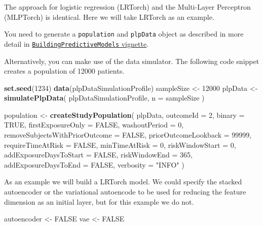 \documentclass[]{article}
\newenvironment{Shaded}{\begin{snugshade}}{\end{snugshade}}
\newcommand{\KeywordTok}[1]{\textcolor[rgb]{0.13,0.29,0.53}{\textbf{#1}}}
\newcommand{\DataTypeTok}[1]{\textcolor[rgb]{0.13,0.29,0.53}{#1}}
\newcommand{\DecValTok}[1]{\textcolor[rgb]{0.00,0.00,0.81}{#1}}
\newcommand{\StringTok}[1]{\textcolor[rgb]{0.31,0.60,0.02}{#1}}
\newcommand{\OtherTok}[1]{\textcolor[rgb]{0.56,0.35,0.01}{#1}}
\newcommand{\NormalTok}[1]{#1}
\begin{document}
The approach for logistic regression (LRTorch) and the Multi-Layer
Perceptron (MLPTorch) is identical. Here we will take LRTorch as an
example.

You need to generate a \texttt{population} and \texttt{plpData} object
as described in more detail in
\href{https://github.com/OHDSI/PatientLevelPrediction/blob/master/inst/doc/BuildingPredictiveModels.pdf}{\texttt{BuildingPredictiveModels}
vignette}.

Alternatively, you can make use of the data simulator. The following
code snippet creates a population of 12000 patients.

\begin{Shaded}
\begin{Highlighting}[]
\KeywordTok{set.seed}\NormalTok{(}\DecValTok{1234}\NormalTok{)}
\KeywordTok{data}\NormalTok{(plpDataSimulationProfile)}
\NormalTok{sampleSize <-}\StringTok{ }\DecValTok{12000}
\NormalTok{plpData <-}\StringTok{ }\KeywordTok{simulatePlpData}\NormalTok{(}
\NormalTok{  plpDataSimulationProfile,}
  \DataTypeTok{n =}\NormalTok{ sampleSize}
\NormalTok{)}

\NormalTok{population <-}\StringTok{ }\KeywordTok{createStudyPopulation}\NormalTok{(}
\NormalTok{  plpData,}
  \DataTypeTok{outcomeId =} \DecValTok{2}\NormalTok{,}
  \DataTypeTok{binary =} \OtherTok{TRUE}\NormalTok{,}
  \DataTypeTok{firstExposureOnly =} \OtherTok{FALSE}\NormalTok{,}
  \DataTypeTok{washoutPeriod =} \DecValTok{0}\NormalTok{,}
  \DataTypeTok{removeSubjectsWithPriorOutcome =} \OtherTok{FALSE}\NormalTok{,}
  \DataTypeTok{priorOutcomeLookback =} \DecValTok{99999}\NormalTok{,}
  \DataTypeTok{requireTimeAtRisk =} \OtherTok{FALSE}\NormalTok{,}
  \DataTypeTok{minTimeAtRisk =} \DecValTok{0}\NormalTok{,}
  \DataTypeTok{riskWindowStart =} \DecValTok{0}\NormalTok{,}
  \DataTypeTok{addExposureDaysToStart =} \OtherTok{FALSE}\NormalTok{,}
  \DataTypeTok{riskWindowEnd =} \DecValTok{365}\NormalTok{,}
  \DataTypeTok{addExposureDaysToEnd =} \OtherTok{FALSE}\NormalTok{,}
  \DataTypeTok{verbosity =} \StringTok{"INFO"}
\NormalTok{)}
\end{Highlighting}
\end{Shaded}

As an example we will build a LRTorch model. We could specify the
stacked autoencoder or the variational autoencode to be used for
reducing the feature dimension as an initial layer, but for this example
we do not.

\begin{Shaded}
\begin{Highlighting}[]
\NormalTok{autoencoder <-}\StringTok{ }\OtherTok{FALSE}
\NormalTok{vae <-}\StringTok{ }\OtherTok{FALSE}
\end{Highlighting}
\end{Shaded}
\end{document}
